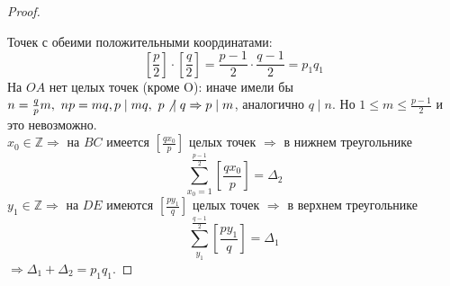 \documentclass[a4paper, 12pt]{article}
\newcommand{\Z}{\mathbb{Z}}
\renewcommand{\div}{\mid}
\theoremstyle{definition}
\begin{document}
\begin{proof}
\begin{center}
        \end{center}
        Точек с обеими положительными координатами: 
        \[[\frac{p}{2}]\cdot[\frac{q}{2}]=\frac{p-1}{2}\cdot \frac{q-1}{2}=p_1 q_1\] 
        На $OA$ нет целых точек (кроме O): иначе имели бы $n=\frac{q}{p}m,\ np=mq,\\
        p\div mq,\ p\not\hspace*{4pt}\div q \Rightarrow p\div m$, аналогично $q\div n$. Но $1\leq m\leq \frac{p-1}{2}$ и это невозможно.\\
        $x_0\in \Z \Rightarrow$ на $BC$ имеется $[\frac{qx_0}{p}]$ целых точек $\Rightarrow$ в нижнем треугольнике 
        \[\sum\limits_{x_0=1}^{\frac{p-1}{2}}[\frac{qx_0}{p}]=\Delta_2\]
        $y_1\in \Z \Rightarrow$ на $DE$ имеются $[\frac{py_1}{q}]$ целых точек $\Rightarrow$ в верхнем треугольнике 
        \[\sum\limits_{y_1}^{\frac{q-1}{2}}[\frac{py_1}{q}]=\Delta_1\]
        $\Rightarrow \Delta_1+\Delta_2=p_1 q_1$.  
    \end{proof} 
\end{document}
